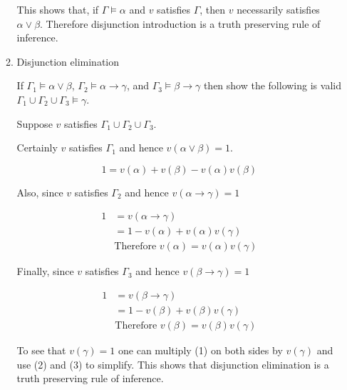 \documentclass[11pt]{report}
\begin{document}
\begin{enumerate}
\begin{enumerate}
			This shows that, if $\Gamma \models \alpha$ and $v$ satisfies $\Gamma$, then $v$ necessarily satisfies $\alpha \lor \beta$. Therefore disjunction introduction is a truth preserving rule of inference. 
			
			\newpage
			\item Disjunction elimination
			
			If $\Gamma_{1} \models \alpha \lor \beta$, $\Gamma_{2} \models \alpha \rightarrow \gamma$, and $\Gamma_{3} \models \beta \rightarrow \gamma$ then show the following is valid $\Gamma_{1}\cup\Gamma_{2}\cup\Gamma_{3} \models \gamma$.

			\hspace{0.2cm}{\bf Solution}

			Suppose $v$ satisfies $\Gamma_{1}\cup\Gamma_{2}\cup\Gamma_{3}$.

			Certainly $v$ satisfies $\Gamma_{1}$ and hence $v(\alpha\lor\beta)=1$.

			\begin{equation}
				1 = v(\alpha) + v(\beta) - v(\alpha)v(\beta)
			\end{equation}

			Also, since $v$ satisfies $\Gamma_{2}$ and hence $v(\alpha \to \gamma)=1$
			
			\begin{equation}
				\begin{split}
					1 &= v(\alpha \to \gamma) \\
					&= 1 - v(\alpha) + v(\alpha)v(\gamma) \\
					&\text{Therefore } v(\alpha) = v(\alpha)v(\gamma)
				\end{split}
			\end{equation}

			Finally, since $v$ satisfies $\Gamma_{3}$ and hence $v(\beta \to \gamma)=1$
			
			\begin{equation}
				\begin{split}
					1 &= v(\beta \to \gamma) \\
					&= 1 - v(\beta) + v(\beta)v(\gamma) \\
					&\text{Therefore } v(\beta) = v(\beta)v(\gamma)
				\end{split}
			\end{equation}
			
			To see that $v(\gamma) = 1$ one can multiply (1) on both sides by $v(\gamma)$ and use (2) and (3) to simplify. This shows that disjunction elimination is a truth preserving rule of inference.  
			

\end{enumerate}
\end{enumerate}
\end{document}
